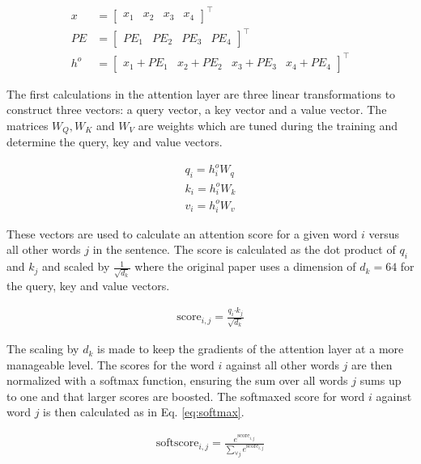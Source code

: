\begin{align}
    x &= \begin{bmatrix} x_1 & x_2 & x_3 & x_4 \end{bmatrix}^\intercal \\
    PE &= \begin{bmatrix} PE_1 & PE_2 & PE_3 & PE_4
    \end{bmatrix}^\intercal \\
    h^o &= \begin{bmatrix} x_1 + PE_1 & x_2 + PE_2 & x_3 + PE_3 & x_4 + PE_4 \end{bmatrix}^\intercal \label{eq:attinp}
\end{align}

The first calculations in the attention layer are three linear transformations to construct three vectors: a query vector, a key vector and a value vector. The matrices $W_Q, W_K$ and $W_V$ are weights which are tuned during the training and determine the query, key and value vectors. 

\begin{align}
    q_i = h_i^o W_q \\
    k_i = h_i^o W_k \\
    v_i = h_i^o W_v 
\end{align}

These vectors are used to calculate an attention score for a given word $i$ versus all other words $j$ in the sentence. The score is calculated as the dot product of $q_i$ and $k_j$ and scaled by $\displaystyle{\frac{1}{\sqrt{d_k}}}$ where the original paper uses a dimension of $d_k=64$ for the query, key and value vectors.

\begin{align}
    \text{score}_{i,j} = \frac{q_i \boldsymbol{\cdot} k_j}{\sqrt{d_k}}
\end{align}

The scaling by $d_k$ is made to keep the gradients of the attention layer at a more manageable level. The scores for the word $i$ against all other words $j$ are then normalized with a softmax function, ensuring the sum over all words $j$ sums up to one and that larger scores are boosted. The softmaxed score for word $i$ against word $j$ is then calculated as in Eq. \ref{eq:softmax}.

\begin{align}
    \text{softscore}_{i,j} = \frac{e^{\text{score}_{i,j}}}{\sum\limits_{\forall j} e^{\text{score}_{i,j}}}
    \label{eq:softmax}
\end{align}


